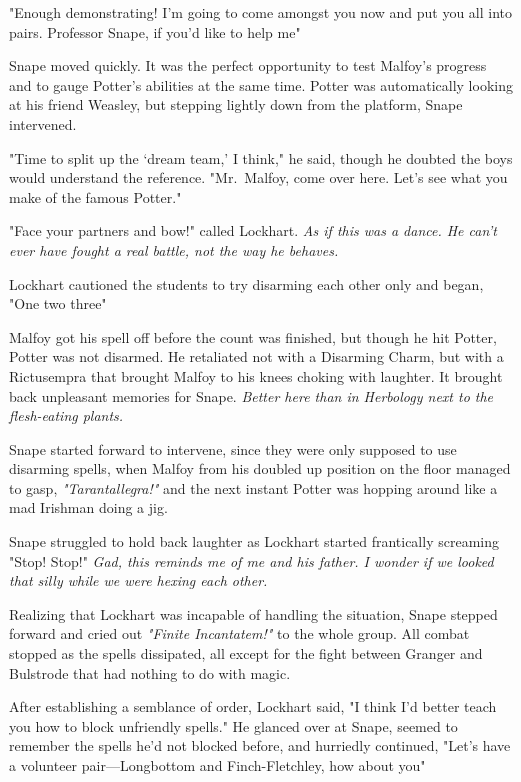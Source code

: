 "Enough demonstrating! I'm going to come amongst you now and put you all into pairs. Professor Snape, if you'd like to help me{\el}"

Snape moved quickly. It was the perfect opportunity to test Malfoy's progress and to gauge Potter's abilities at the same time. Potter was automatically looking at his friend Weasley, but stepping lightly down from the platform, Snape intervened.

"Time to split up the `dream team,' I think," he said, though he doubted the boys would understand the reference. "Mr.~Malfoy, come over here. Let's see what you make of the famous Potter."

"Face your partners and bow!" called Lockhart. \emph{As if this was a dance. He can't ever have fought a real battle, not the way he behaves.}

Lockhart cautioned the students to try disarming each other only and began, "One{\el} two{\el} three{\el}"

Malfoy got his spell off before the count was finished, but though he hit Potter, Potter was not disarmed. He retaliated not with a Disarming Charm, but with a Rictusempra that brought Malfoy to his knees choking with laughter. It brought back unpleasant memories for Snape. \emph{Better here than in Herbology next to the flesh-eating plants.}

Snape started forward to intervene, since they were only supposed to use disarming spells, when Malfoy from his doubled up position on the floor managed to gasp, \emph{"Tarantallegra!"} and the next instant Potter was hopping around like a mad Irishman doing a jig.

Snape struggled to hold back laughter as Lockhart started frantically screaming "Stop! Stop!" \emph{Gad, this reminds me of me and his father. I wonder if we looked that silly while we were hexing each other.}

Realizing that Lockhart was incapable of handling the situation, Snape stepped forward and cried out \emph{"Finite Incantatem!"} to the whole group. All combat stopped as the spells dissipated, all except for the fight between Granger and Bulstrode that had nothing to do with magic.

After establishing a semblance of order, Lockhart said, "I think I'd better teach you how to block unfriendly spells." He glanced over at Snape, seemed to remember the spells he'd not blocked before, and hurriedly continued, "Let's have a volunteer pair—Longbottom and Finch-Fletchley, how about you{\el}"

